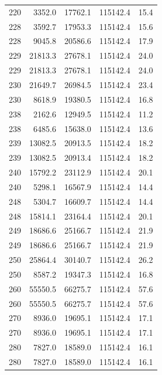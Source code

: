 \begin{longtable}{rrrrr}
    220 & \num{3352.0} & \num{17762.1} & \num{115142.4} & 15.4 \\
    228 & \num{3592.7} & \num{17953.3} & \num{115142.4} & 15.6 \\
    228 & \num{9045.8} & \num{20586.6} & \num{115142.4} & 17.9 \\
    229 & \num{21813.3} & \num{27678.1} & \num{115142.4} & 24.0 \\
    229 & \num{21813.3} & \num{27678.1} & \num{115142.4} & 24.0 \\
    230 & \num{21649.7} & \num{26984.5} & \num{115142.4} & 23.4 \\
    230 & \num{8618.9} & \num{19380.5} & \num{115142.4} & 16.8 \\
    238 & \num{2162.6} & \num{12949.5} & \num{115142.4} & 11.2 \\
    238 & \num{6485.6} & \num{15638.0} & \num{115142.4} & 13.6 \\
    239 & \num{13082.5} & \num{20913.5} & \num{115142.4} & 18.2 \\
    239 & \num{13082.5} & \num{20913.4} & \num{115142.4} & 18.2 \\
    240 & \num{15792.2} & \num{23112.9} & \num{115142.4} & 20.1 \\
    240 & \num{5298.1} & \num{16567.9} & \num{115142.4} & 14.4 \\
    248 & \num{5304.7} & \num{16609.7} & \num{115142.4} & 14.4 \\
    248 & \num{15814.1} & \num{23164.4} & \num{115142.4} & 20.1 \\
    249 & \num{18686.6} & \num{25166.7} & \num{115142.4} & 21.9 \\
    249 & \num{18686.6} & \num{25166.7} & \num{115142.4} & 21.9 \\
    250 & \num{25864.4} & \num{30140.7} & \num{115142.4} & 26.2 \\
    250 & \num{8587.2} & \num{19347.3} & \num{115142.4} & 16.8 \\
    260 & \num{55550.5} & \num{66275.7} & \num{115142.4} & 57.6 \\
    260 & \num{55550.5} & \num{66275.7} & \num{115142.4} & 57.6 \\
    270 & \num{8936.0} & \num{19695.1} & \num{115142.4} & 17.1 \\
    270 & \num{8936.0} & \num{19695.1} & \num{115142.4} & 17.1 \\
    280 & \num{7827.0} & \num{18589.0} & \num{115142.4} & 16.1 \\
    280 & \num{7827.0} & \num{18589.0} & \num{115142.4} & 16.1 \\

\end{longtable}
